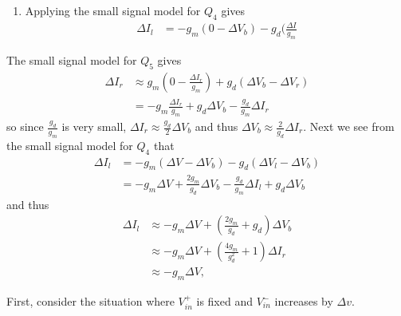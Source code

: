 \documentclass{article}
\begin{document}
\begin{enumerate}
{\begin{enumerate}
{        \begin{align*}
        \Delta I_r &= g_m (\Delta v - \frac{\Delta I_r}{g_m})
                    + g_d (\Delta V_b - \frac{\Delta I_r}{g_m}) \\
                   &= g_m \Delta v - \Delta I_r 
                    + 2 \Delta I_r - \frac{g_d}{g_m} \Delta I_r 
        \end{align*}
        so $\frac{g_d}{g_m} \Delta I_r = g_m \Delta v$, or
        $\Delta I_r = \frac{g_m^2}{g_d} \Delta v$, so
        $\Delta V_b = 2\frac{g_m^2}{g_d^2} \Delta v$.
      }
      \item{
        Applying the small signal model for $Q_4$ gives
        \begin{align*}
          \Delta I_l &= -g_m(0 - \Delta V_b)
                        -g_d(\frac{\Delta I}{g_m}
        \end{align*}
      }
    \end{enumerate}
  }
\end{enumerate}

The small signal model for $Q_5$ gives
\begin{align*}
\Delta I_r &\approx g_m (0 - \frac{\Delta I_r}{g_m}) 
                  + g_d(\Delta V_b - \Delta V_r) \\
           &=      - g_m \frac{\Delta I_r}{g_m} 
                   + g_d \Delta V_b 
                   - \frac{g_d}{g_m} \Delta I_r
\end{align*}
so since $\frac{g_d}{g_m}$ is very small, 
$\Delta I_r \approx \frac{g_d}{2} \Delta V_b$ and thus
$\Delta V_b \approx \frac{2}{g_d} \Delta I_r$. Next we see from the small
signal model for $Q_4$ that
\begin{align*}
\Delta I_l &= -g_m (\Delta V - \Delta V_b)
              -g_d (\Delta V_l - \Delta V_b) \\
           &= -g_m \Delta V + \frac{2 g_m}{g_d} \Delta V_b 
              -\frac{g_d}{g_m} \Delta I_l + g_d \Delta V_b
\end{align*}
and thus
\begin{align*}
\Delta I_l &\approx -g_m \Delta V + \left(\frac{2 g_m}{g_d} + g_d\right) \Delta V_b \\
           &\approx -g_m \Delta V + \left(\frac{4 g_m}{g_d^2} + 1\right) \Delta I_r \\
           &\approx -g_m \Delta V,
\end{align*}



First, consider the situation where $V_{in}^{+}$ is fixed and
$V_{in}^{-}$ increases by $\Delta v$.
\end{document}
